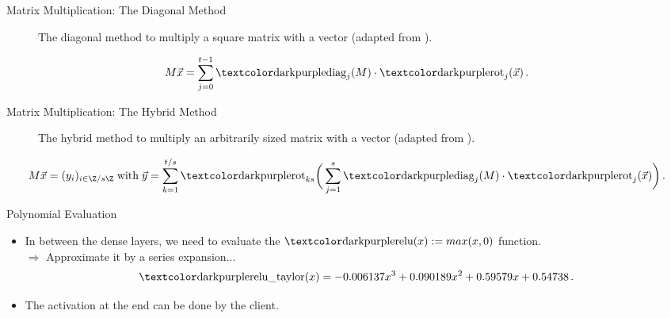 \begin{frame}{Matrix Multiplication: The Diagonal Method}
  \begin{figure}[H]
    \centering
    \hspace{\matmulhoffset}
    \caption[Diagonal matrix multiplication method]{The diagonal method to multiply a square matrix with a vector (adapted from \cite{2018-gazelle}).}
    \label{fig:diagonal-method}
  \end{figure}

  $$M \vec{x} = \sum_{j=0}^{t-1} \diag_j(M) \cdot \rot_j(\vec{x}) \,.$$
\end{frame}

\begin{frame}{Matrix Multiplication: The Hybrid Method}
  \begin{figure}[H]
    \centering
    \hspace{\matmulhoffset}
    \caption[Hybrid matrix multiplication method]{The hybrid method to multiply an arbitrarily sized matrix with a vector (adapted from \cite{2018-gazelle}).}
    \label{fig:hybrid-method}
  \end{figure}

  $$M \vec{x} = (y_i)_{i \in \Z/s\Z} \;\text{with}\; \vec{y} = \sum_{k=1}^{t / s} \rot_{ks}\bigg(\sum_{j=1}^s \diag_j(M) \cdot \rot_j(\vec{x})\bigg) \,.$$
\end{frame}

\begin{frame}{Polynomial Evaluation}
  \begin{itemize}
    \item In between the dense layers, we need to evaluate the $\cryptop{relu}(x) := max(x, 0)$ function. \\
          $\Rightarrow$ Approximate it by a series expansion...
          $$\cryptop{relu\_taylor}(x) = -0.006137 x^3 + 0.090189 x^2 + 0.59579 x + 0.54738 \,.$$
    \item The  activation at the end can be done by the client.
  \end{itemize}

  \begin{figure}[H]
    \centering
    \label{fig:taylor-relu}
  \end{figure}
\end{frame}
